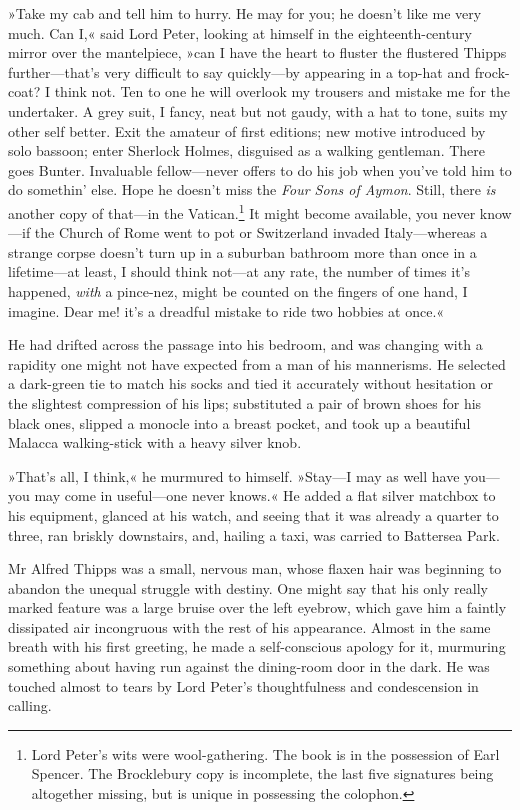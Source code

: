 »Take my cab and tell him to hurry. He may for you; he doesn't like me very much. Can I,« said Lord Peter, looking at himself in the eighteenth-century mirror over the mantelpiece, »can I have the heart to fluster the flustered Thipps further—that's very difficult to say quickly—by appearing in a top-hat and frock-coat? I think not. Ten to one he will overlook my trousers and mistake me for the undertaker. A grey suit, I fancy, neat but not gaudy, with a hat to tone, suits my other self better. Exit the amateur of first editions; new motive introduced by solo bassoon; enter Sherlock Holmes, disguised as a walking gentleman. There goes Bunter. Invaluable fellow—never offers to do his job when you've told him to do somethin' else. Hope he doesn't miss the \textit{Four Sons of Aymon}. Still, there \textit{is} another copy of that—in the Vatican.\footnote{Lord Peter's wits were wool-gathering. The book is in the possession of Earl Spencer. The Brocklebury copy is incomplete, the last five signatures being altogether missing, but is unique in possessing the colophon.} It might become available, you never know—if the Church of Rome went to pot or Switzerland invaded Italy—whereas a strange corpse doesn't turn up in a suburban bathroom more than once in a lifetime—at least, I should think not—at any rate, the number of times it's happened, \textit{with} a pince-nez, might be counted on the fingers of one hand, I imagine. Dear me! it's a dreadful mistake to ride two hobbies at once.«

He had drifted across the passage into his bedroom, and was changing with a rapidity one might not have expected from a man of his mannerisms. He selected a dark-green tie to match his socks and tied it accurately without hesitation or the slightest compression of his lips; substituted a pair of brown shoes for his black ones, slipped a monocle into a breast pocket, and took up a beautiful Malacca walking-stick with a heavy silver knob.

»That's all, I think,« he murmured to himself. »Stay—I may as well have you—you may come in useful—one never knows.« He added a flat silver matchbox to his equipment, glanced at his watch, and seeing that it was already a quarter to three, ran briskly downstairs, and, hailing a taxi, was carried to Battersea Park.

Mr Alfred Thipps was a small, nervous man, whose flaxen hair was beginning to abandon the unequal struggle with destiny. One might say that his only really marked feature was a large bruise over the left eyebrow, which gave him a faintly dissipated air incongruous with the rest of his appearance. Almost in the same breath with his first greeting, he made a self-conscious apology for it, murmuring something about having run against the dining-room door in the dark. He was touched almost to tears by Lord Peter's thoughtfulness and condescension in calling.


